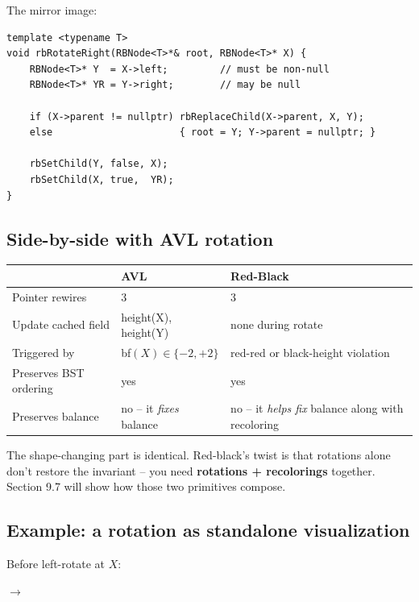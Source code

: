 \documentclass[11pt]{article}
\begin{document}
The mirror image:

\begin{lstlisting}
template <typename T>
void rbRotateRight(RBNode<T>*& root, RBNode<T>* X) {
    RBNode<T>* Y  = X->left;         // must be non-null
    RBNode<T>* YR = Y->right;        // may be null

    if (X->parent != nullptr) rbReplaceChild(X->parent, X, Y);
    else                      { root = Y; Y->parent = nullptr; }

    rbSetChild(Y, false, X);
    rbSetChild(X, true,  YR);
}
\end{lstlisting}

\subsection*{Side-by-side with AVL rotation}

\begin{center}
\begin{tabular}{lll}
                         & AVL                         & Red-Black \\
\hline
Pointer rewires          & 3                           & 3 \\
Update cached field      & height(X), height(Y)        & none during rotate \\
Triggered by             & bf$(X) \in \{-2, +2\}$       & red-red or black-height violation \\
Preserves BST ordering   & yes                         & yes \\
Preserves balance        & no -- it \emph{fixes} balance & no -- it \emph{helps fix} balance along with recoloring \\
\end{tabular}
\end{center}

The shape-changing part is identical. Red-black's twist is that rotations alone don't restore the invariant -- you need \textbf{rotations + recolorings} together. Section 9.7 will show how those two primitives compose.

\subsection*{Example: a rotation as standalone visualization}

\begin{center}
Before left-rotate at $X$:
\quad $\to$ \quad
{}
\end{center}
\end{document}
